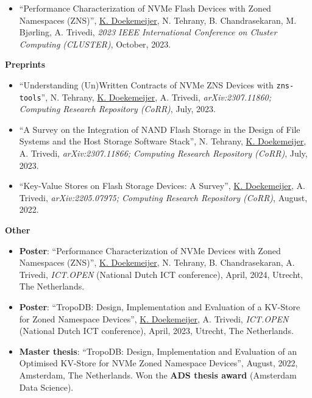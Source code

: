 \documentclass[letterpaper,11pt]{article}
\begin{document}
\begin{itemize}[label={}]
\item
  ``Performance Characterization of NVMe Flash Devices with Zoned Namespaces (ZNS)'', 
  \underline{K. Doekemeijer}, N. Tehrany, B. Chandrasekaran, M. Bjørling, A. Trivedi,
  \textit{2023 IEEE International Conference on Cluster Computing (CLUSTER)}, 
  October, 2023.

\end{itemize}

\textbf{Preprints}
\begin{itemize}[label={}]
\item
  ``Understanding (Un)Written Contracts of NVMe ZNS Devices with \texttt{zns-tools}'', 
  N. Tehrany, \underline{K. Doekemeijer}, A. Trivedi,
  \textit{arXiv:2307.11860; Computing Research Repository (CoRR)}, 
  July, 2023.

\item
  ``A Survey on the Integration of NAND Flash Storage in the Design of File Systems and the Host Storage Software Stack'', 
  N. Tehrany, \underline{K. Doekemeijer}, A. Trivedi,
  \textit{arXiv:2307.11866; Computing Research Repository (CoRR)}, 
  July, 2023.

\item
  ``Key-Value Stores on Flash Storage Devices: A Survey'', 
  \underline{K. Doekemeijer}, A. Trivedi,
  \textit{arXiv:2205.07975; Computing Research Repository (CoRR)}, 
  August, 2022.
\end{itemize}


\textbf{Other}
\begin{itemize}[label={}]
\item
  \textbf{Poster}: 
  ``Performance Characterization of NVMe Devices with Zoned Namespaces (ZNS)'',
  \underline{K. Doekemeijer}, N. Tehrany, B. Chandrasekaran, A. Trivedi,
  \textit{ICT.OPEN} (National Dutch ICT conference),
  April, 2024, Utrecht, The Netherlands.

\item
  \textbf{Poster}: 
  ``TropoDB: Design, Implementation and Evaluation of a KV-Store for Zoned Namespace Devices'',
  \underline{K. Doekemeijer}, A. Trivedi,
  \textit{ICT.OPEN} (National Dutch ICT conference),
  April, 2023, Utrecht, The Netherlands.

\item
  \textbf{Master thesis}: 
  ``TropoDB: Design, Implementation and Evaluation of an Optimised KV-Store for NVMe Zoned Namespace Devices'',
  August, 2022, Amsterdam, The Netherlands.
  Won the \textbf{ADS thesis award} (Amsterdam Data Science).
\end{itemize}
\end{document}
